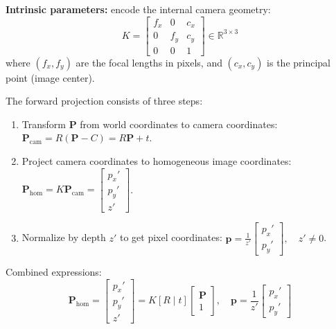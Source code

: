 \documentclass[12pt,a4paper]{article}
\theoremstyle{definition}
\newcommand{\R}{\mathbb{R}}
\newcommand{\vect}[1]{\bm{#1}}
\begin{document}
\noindent\textbf{Intrinsic parameters:} encode the internal camera geometry:
\vspace{-0.5em}
\begin{equation}
K = \begin{bmatrix}
f_x & 0 & c_x \\
0 & f_y & c_y \\
0 & 0 & 1
\end{bmatrix} \in \R^{3 \times 3}
\label{eq:intrinsic}
\end{equation}
where \((f_x, f_y)\) are the focal lengths in pixels, and \((c_x, c_y)\) is the principal point (image center).

The forward projection consists of three steps:
\begin{enumerate}[noitemsep, topsep=0pt, parsep=0pt, partopsep=0pt]
    \item Transform \(\vect{P}\) from world coordinates to camera coordinates: \(\vect{P}_{\text{cam}} = R (\vect{P} - C) = R \vect{P} + t\).
    \item Project camera coordinates to homogeneous image coordinates: \(\vect{P}_{\text{hom}} = K \vect{P}_{\text{cam}} = \begin{bmatrix} p_x' \\ p_y' \\ z' \end{bmatrix}\).
    \vspace{-0.5em}
    \item Normalize by depth \(z'\) to get pixel coordinates: \(\vect{p} = \frac{1}{z'} \begin{bmatrix} p_x' \\ p_y' \end{bmatrix}, \quad z' \neq 0\).
\end{enumerate}

Combined expressions:
\begin{equation}
\boxed{
\vect{P}_{\text{hom}} = \begin{bmatrix} p_x' \\ p_y' \\ z' \end{bmatrix} = K [R \mid t] \begin{bmatrix} \vect{P} \\ 1 \end{bmatrix}, \quad
\vect{p} = \frac{1}{z'} \begin{bmatrix} p_x' \\ p_y' \end{bmatrix}
}
\label{eq:forward}
\end{equation}
\end{document}
